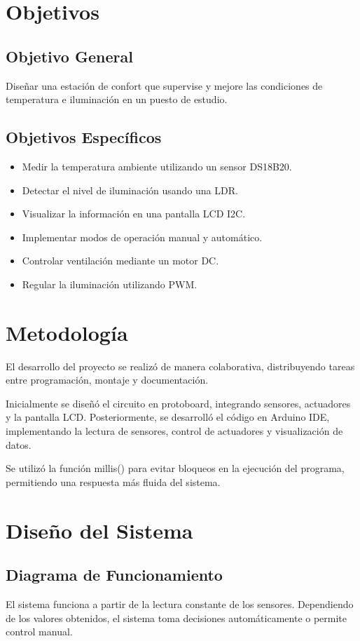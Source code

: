 \documentclass[conference]{IEEEtran}
\begin{document}
\section{Objetivos}
\subsection{Objetivo General}
Diseñar una estación de confort que supervise y mejore las condiciones de temperatura e iluminación
en un puesto de estudio.
\subsection{Objetivos Específicos}
\begin{itemize}
    \item Medir la temperatura ambiente utilizando un sensor DS18B20.
    \item Detectar el nivel de iluminación usando una LDR.
    \item Visualizar la información en una pantalla LCD I2C.
    \item Implementar modos de operación manual y automático.
    \item Controlar ventilación mediante un motor DC.
    \item Regular la iluminación utilizando PWM.
\end{itemize}

\section{Metodología}
El desarrollo del proyecto se realizó de manera colaborativa, distribuyendo tareas entre 
programación, montaje y documentación.

Inicialmente se diseñó el circuito en protoboard, integrando sensores, actuadores y la pantalla LCD. 
Posteriormente, se desarrolló el código en Arduino IDE, implementando la lectura de sensores, 
control de actuadores y visualización de datos.

Se utilizó la función millis() para evitar bloqueos en la ejecución del programa, permitiendo 
una respuesta más fluida del sistema.

\section{Diseño del Sistema}
\subsection{Diagrama de Funcionamiento}
El sistema funciona a partir de la lectura constante de los sensores. Dependiendo de los valores
obtenidos, el sistema toma decisiones automáticamente o permite control manual.
\end{document}
